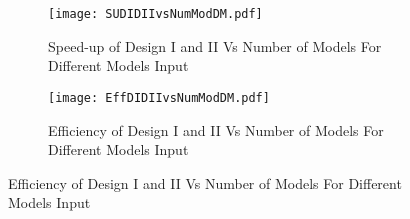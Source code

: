 \begin{figure}
\centering
\captionsetup[subfigure]{labelformat=empty}
\begin{subfigure}
\centering
\texttt{[image: SUDIDIIvsNumModDM.pdf]}
\label{fig:SUDIDIIvsNumModDM}
\caption{Speed-up of Design I and II Vs Number of Models For Different Models Input}
\end{subfigure}
\begin{subfigure}
\centering
\texttt{[image: EffDIDIIvsNumModDM.pdf]}
\label{fig:EffDIDIIvsNumModDM}
\caption{Efficiency of Design I and II Vs Number of Models For Different Models Input}
\end{subfigure}
\end{figure}

  